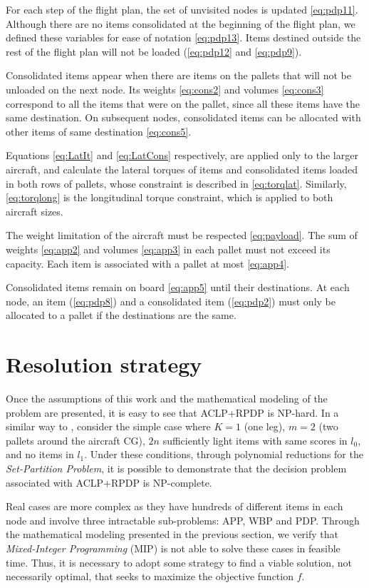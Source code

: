 \documentclass[preprint,authoryear]{elsarticle}
\begin{document}
For each step of the flight plan, the set of unvisited nodes is updated \ref{eq:pdp11}. Although there are no items consolidated at the beginning of the flight plan, we defined these variables for ease of notation \ref{eq:pdp13}. Items destined outside the rest of the flight plan will not be loaded (\ref{eq:pdp12} and \ref{eq:pdp9}).

Consolidated items appear when there are items on the pallets that will not be unloaded on the next node. Its weights \ref{eq:cons2} and volumes \ref{eq:cons3} correspond to all the items that were on the pallet, since all these items have the same destination. On subsequent nodes, consolidated items can be allocated with other items of same destination \ref{eq:cons5}.

Equations \ref{eq:LatIt} and \ref{eq:LatCons} respectively, are applied only to the larger aircraft, and calculate the lateral torques of items and consolidated items loaded in both rows of pallets, whose constraint is described in \ref{eq:torqlat}. Similarly, \ref{eq:torqlong} is the longitudinal torque constraint, which is applied to both aircraft sizes.

The weight limitation of the aircraft must be respected \ref{eq:payload}. The sum of weights \ref{eq:app2} and volumes \ref{eq:app3} in each pallet must not exceed its capacity. Each item is associated with a pallet at most \ref{eq:app4}.

Consolidated items remain on board \ref{eq:app5} until their destinations. At each node, an item (\ref{eq:pdp8}) and a consolidated item (\ref{eq:pdp2}) must only be allocated to a pallet if the destinations are the same.


\section{Resolution strategy}
\label{sec5}

Once the assumptions of this work and the mathematical modeling of the problem are presented, it is easy to see that ACLP+RPDP is NP-hard. In a similar way to \cite[p. 6]{LurkinSchyns2015}, consider the simple case where $K=1$\/ (one leg), $m=2$ (two pallets around the aircraft CG), $2n$\/ sufficiently light items with same scores in $l_0$, and no items in $l_1$. Under these conditions, through polynomial reductions for the {\it Set-Partition Problem}, it is possible to demonstrate that the decision problem associated with ACLP+RPDP is NP-complete.

Real cases are more complex as they have hundreds of different items in each node and involve three intractable sub-problems: APP, WBP and PDP. Through the mathematical modeling presented in the previous section, we verify that {\it Mixed-Integer Programming}\/ (MIP) is not able to solve these cases in feasible time. Thus, it is necessary to adopt some strategy to find a viable solution, not necessarily optimal, that seeks to maximize the objective function $f$.
\end{document}
